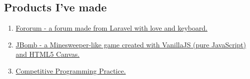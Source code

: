 \documentclass{article}
\begin{document}
        \subsection{Products I've made}
            \begin{enumerate}
                \item \href{https://github.com/trhgquan/Fororum}{Fororum - a forum made from Laravel with love and keyboard.}
                \item \href{https://github.com/trhgquan/JBomb}{JBomb - a Minesweeper-like game created with VanillaJS (pure JavaScript) and HTML5 Canvas.}
                \item \href{https://github.com/trhgquan/CPP}{Competitive Programming Practice.}
            \end{enumerate}



\end{document}
